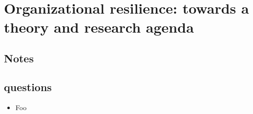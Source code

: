 \chapter{Organizational resilience: towards a theory and research agenda \cite{vogus2007organizational}}
\section{Notes}

\section{questions}
\begin{itemize}
  \item Foo
\end{itemize}

